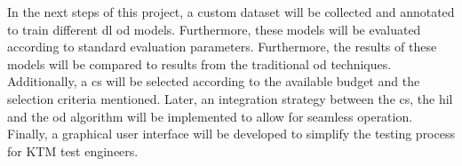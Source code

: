 In the next steps of this project, a custom dataset will be collected and annotated to train different \gls{dl} \gls{od} models. Furthermore, these models will be evaluated according to standard evaluation parameters. Furthermore, the results of these models will be compared to results from the traditional \gls{od} techniques. Additionally, a \gls{cs} will be selected according to the available budget and the selection criteria mentioned. Later, an integration strategy between the \gls{cs}, the \gls{hil} and the \gls{od} algorithm will be implemented to allow for seamless operation. Finally, a graphical user interface will be developed to simplify the testing process for KTM test engineers.